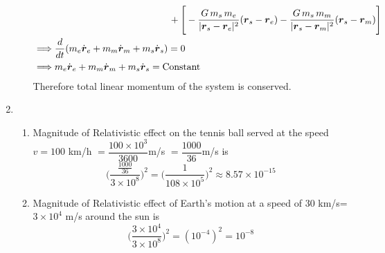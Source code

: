 \documentclass{article}
\begin{document}
\begin{enumerate}
\begin{enumerate}
\begin{align*}
	&\qquad\qquad\qquad\qquad\qquad\qquad+\Bigg[-\dfrac{G\, m_s\,m_e}{|\boldsymbol{r}_s-\boldsymbol{r}_e|^2}(\boldsymbol{r}_s-\boldsymbol{r}_e)-\dfrac{G\, m_s\,m_m}{|\boldsymbol{r}_s-\boldsymbol{r}_m|^2}(\boldsymbol{r}_s-\boldsymbol{r}_m)\Bigg]\\
	\implies &\frac{d}{dt}(m_e\dot{\boldsymbol{r}}_e+m_m\dot{\boldsymbol{r}}_m+m_s\dot{\boldsymbol{r}}_s)=0\\
	\implies & m_e\dot{\boldsymbol{r}}_e+m_m\dot{\boldsymbol{r}}_m+m_s\dot{\boldsymbol{r}}_s=\text{Constant}
	\end{align*}Therefore total linear momentum of the system is conserved.
		\end{enumerate}
	\item \begin{enumerate}
		\item Magnitude of Relativistic effect on the tennis ball served at  the speed $v=100$ km/h $ =\dfrac{100\times 10^3}{3600}$m/s $=\dfrac{1000}{36} $m/s is  $$\Bigg(\frac{\frac{1000}{36}}{3\times 10^8}\Bigg)^2=\Bigg(\frac{1}{108\times 10^5}\Bigg)^2\approx 8.57\times 10^{-15}$$
		\item  Magnitude of Relativistic effect of Earth's motion at a speed of 30 km/s=$3\times 10^4$ m/s around the sun is $$\Bigg(\frac{3\times 10^4}{3\times 10^8}\Bigg)^2=(10^{-4})^2=10^{-8}$$
	\end{enumerate}
	\end{enumerate}
\end{document}
